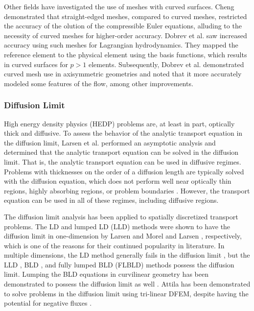 \documentclass{article}
\begin{document}

Other fields have investigated the use of meshes with curved surfaces. Cheng \cite{ChengCurvMeshEulerEqs} demonstrated that straight-edged meshes, compared to curved meshes, restricted the accuracy of the olution of the compressible Euler equations, alluding to the necessity of curved meshes for higher-order accuracy. Dobrev et al. \cite{DobrevHOFEMHydro} saw increased accuracy using such meshes for Lagrangian hydrodynamics. They mapped the reference element to the physical element using the basis functions, which results in curved surfaces for $p>1$ elements. Subsequently, Dobrev et al. \cite{DobrevHOAxisymmetric} demonstrated curved mesh use in axisymmetric geometries and noted that it more accurately modeled some features of the flow, among other improvements.


\subsubsection{Diffusion Limit}

High energy density physics (HEDP) problems are, at least in part, optically thick and diffusive. To assess the behavior of the analytic transport equation in the diffusion limit, Larsen et al. \cite{LarsenAsymptoticSoln1} performed an asymptotic analysis and determined that the analytic transport equation can be solved in the diffusion limit. That is, the analytic transport equation can be used in diffusive regimes. Problems with thicknesses on the order of a diffusion length are typically solved with the diffusion equation, which does not perform well near optically thin regions, highly absorbing regions, or problem boundaries \cite{D&H}. However, the transport equation can be used in all of these regimes, including diffusive regions.

The diffusion limit analysis has been applied to spatially discretized transport problems. The LD and lumped LD (LLD) methods were shown to have the diffusion limit in one-dimension by Larsen and Morel \cite{LarsenAsymptotic} and Larsen \cite{LarsenAsymptoticDiffusionLimit}, respectively, which is one of the reasons for their continued popularity in literature. In multiple dimensions, the LD method generally fails in the diffusion limit \cite{BorgersAsymptoticDiffLimit}, but the LLD \cite{MorelLLDrz, MorelLLDTetrahedral}, BLD \cite{Adams_Disc_FEM_Thick_Diff}, and fully lumped BLD (FLBLD) \cite{AdamsDFEMDiffLimit} methods possess the diffusion limit. Lumping the BLD equations in curvilinear geometry has been demonstrated to possess the diffusion limit as well \cite{PalmerCurvilinearTransport, MorelLBLD}. Attila has been demonstrated to solve problems in the diffusion limit using tri-linear DFEM, despite having the potential for negative fluxes \cite{AttilaUsersManual}.
\end{document}
